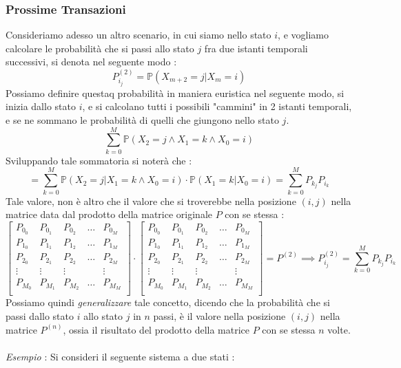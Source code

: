 \documentclass[12pt, letterpaper]{article}
\newcommand{\acc}{\\\hphantom{}\\}
\newcommand{\Prob}{{\mathbb P}}
\begin{document}
\subsubsection{Prossime Transazioni}
Consideriamo adesso un altro scenario, in cui siamo nello stato \(i\), e vogliamo calcolare le probabilità che 
si passi allo stato \(j\) fra due istanti temporali successivi, si denota nel seguente modo :
$$P^{(2)}_{i_j}=\Prob(X_{m+2}=j|X_m=i)$$
Possiamo definire questaq probabilità in maniera euristica nel seguente modo, si inizia dallo stato \(i\), e si calcolano 
tutti i possibili "cammini" in 2 istanti temporali, e se ne sommano le probabilità di quelli che giungono nello 
stato \(j\).
$$\sum_{k=0}^M\Prob(X_2=j\land X_1=k\land X_0=i)$$
Sviluppando tale sommatoria si noterà che : 
$$=\sum_{k=0}^M\Prob(X_2=j| X_1=k\land X_0=i)\cdot \Prob(X_1=k|X_0=i)=\sum_{k=0}^MP_{k_j}P_{i_k}$$
Tale valore, non è altro che il valore che si troverebbe nella posizione \((i,j)\) nella matrice 
data dal prodotto della matrice originale \(P\) con se stessa : $$
\begin{bmatrix}
    P_{0_0}& P_{0_1}& P_{0_2}&\dots&P_{0_M}\\
    P_{1_0}& P_{1_1}& P_{1_2}&\dots&P_{1_M}\\
    P_{2_0}& P_{2_1}& P_{2_2}&\dots&P_{2_M}\\
    \vdots &\vdots &\vdots &&\vdots \\
    P_{M_0}& P_{M_1}& P_{M_2}&\dots&P_{M_M}\\
\end{bmatrix}\cdot \begin{bmatrix}
    P_{0_0}& P_{0_1}& P_{0_2}&\dots&P_{0_M}\\
    P_{1_0}& P_{1_1}& P_{1_2}&\dots&P_{1_M}\\
    P_{2_0}& P_{2_1}& P_{2_2}&\dots&P_{2_M}\\
    \vdots &\vdots &\vdots &&\vdots \\
    P_{M_0}& P_{M_1}& P_{M_2}&\dots&P_{M_M}\\
\end{bmatrix} = P^{(2)}\implies P^{(2)}_{i_j}=\sum_{k=0}^MP_{k_j}P_{i_k}
    $$
Possiamo quindi \textit{generalizzare} tale concetto, dicendo che la probabilità che si passi dallo 
stato \(i\) allo stato \(j\) in \(n\) passi, è il valore nella posizione \((i,j)\) nella matrice 
\(P^{(n)}\), ossia il risultato del prodotto della matrice \(P\) con se stessa \(n\) volte.\acc 
\textit{Esempio} : Si consideri il seguente sistema a due stati :\begin{figure}[h]
\end{figure}
\end{document}
